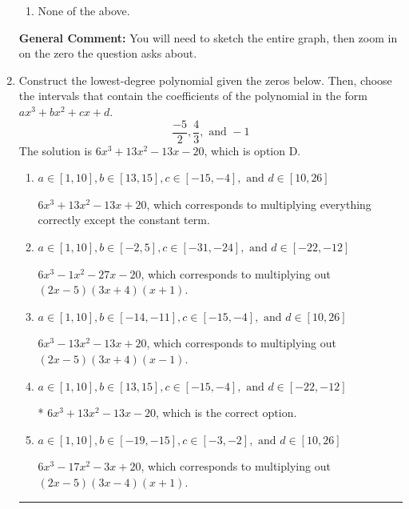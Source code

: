 \documentclass{extbook}[14pt]
\newcommand{\litem}[1]{\item #1

\rule{\textwidth}{0.4pt}}
\begin{document}
\begin{enumerate}
{\begin{enumerate}[label=\Alph*.]
\item None of the above.\end{enumerate}
\textbf{General Comment:} You will need to sketch the entire graph, then zoom in on the zero the question asks about.
}
\litem{
Construct the lowest-degree polynomial given the zeros below. Then, choose the intervals that contain the coefficients of the polynomial in the form $ax^3+bx^2+cx+d$.
\[ \frac{-5}{2}, \frac{4}{3}, \text{ and } -1 \]The solution is \( 6x^{3} +13 x^{2} -13 x -20 \), which is option D.\begin{enumerate}[label=\Alph*.]
\item \( a \in [1, 10], b \in [13, 15], c \in [-15, -4], \text{ and } d \in [10, 26] \)

$6x^{3} +13 x^{2} -13 x + 20$, which corresponds to multiplying everything correctly except the constant term.
\item \( a \in [1, 10], b \in [-2, 5], c \in [-31, -24], \text{ and } d \in [-22, -12] \)

$6x^{3} -1 x^{2} -27 x -20$, which corresponds to multiplying out $(2x -5)(3x + 4)(x + 1)$.
\item \( a \in [1, 10], b \in [-14, -11], c \in [-15, -4], \text{ and } d \in [10, 26] \)

$6x^{3} -13 x^{2} -13 x + 20$, which corresponds to multiplying out $(2x -5)(3x + 4)(x -1)$.
\item \( a \in [1, 10], b \in [13, 15], c \in [-15, -4], \text{ and } d \in [-22, -12] \)

* $6x^{3} +13 x^{2} -13 x -20$, which is the correct option.
\item \( a \in [1, 10], b \in [-19, -15], c \in [-3, -2], \text{ and } d \in [10, 26] \)

$6x^{3} -17 x^{2} -3 x + 20$, which corresponds to multiplying out $(2x -5)(3x -4)(x + 1)$.
\end{enumerate}

}
\end{enumerate}
\end{document}

